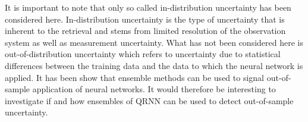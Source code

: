 \documentclass[journal abbreviation, manuscript]{copernicus}
\begin{document}
It is important to note that only so called in-distribution uncertainty has been
considered here. In-distribution uncertainty is the type of uncertainty that is
inherent to the retrieval and stems from limited resolution of the observation
system as well as measurement uncertainty. What has not been considered here is
out-of-distribution uncertainty which refers to uncertainty due to statistical
differences between the training data and the data to which the neural network
is applied. It has been show that ensemble methods can be used to signal
out-of-sample application of neural networks. It would therefore be interesting
to investigate if and how ensembles of QRNN can be used to detect out-of-sample
uncertainty.












\appendix
\section{}    %

\subsection{}     %


\noappendix       %

\end{document}
